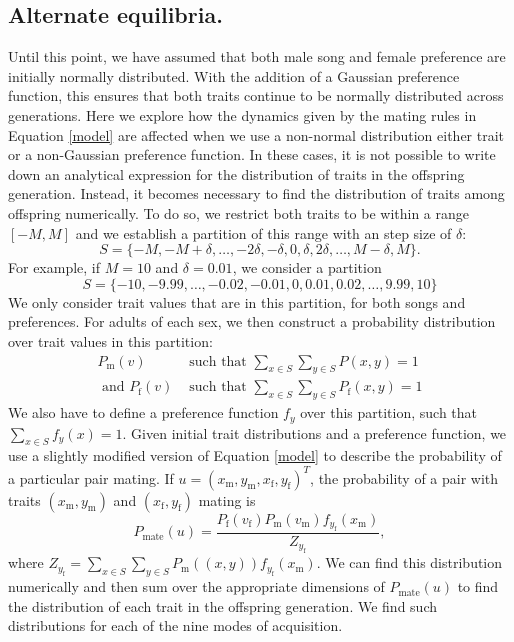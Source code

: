 \documentclass{article}
\newcommand{\x}[1]{\text{#1}}
\begin{document}
\subsection*{Alternate equilibria. }
Until this point, we have assumed that both male song and female preference are initially normally distributed. With the addition of a Gaussian preference function, this ensures that both traits continue to be normally distributed across generations. Here we explore how the dynamics given by the mating rules in Equation \ref{model} are affected when we use a non-normal distribution either trait or a non-Gaussian preference function. In these cases, it is not possible to write down an analytical expression for the distribution of traits in the offspring generation. Instead, it becomes necessary to find the distribution of traits among offspring numerically. To do so, we restrict both traits to be within a range $[-M,M]$ and we establish a partition of this range with an step size of $\delta$:
$$
S=\{-M,-M+\delta,\dots,-2\delta,-\delta,0,\delta,2\delta,\dots,M-\delta,M\}.$$
For example, if $M=10$ and $\delta=0.01$, we consider a partition $$S=\{-10,-9.99,\dots,-0.02,-0.01,0,0.01,0.02,\dots,9.99,10\}$$
We only consider trait values that are in this partition, for both songs and preferences. For adults of each sex, we then construct a probability distribution over trait values in this partition:
\begin{align*}
P_\x{m}(v) &\text{ such that } \sum_{x\in S}\sum_{y \in S}P(x,y)=1
\\ \text{ and } P_\x{f}(v) &\text{ such that } \sum_{x\in S}\sum_{y \in S}P_\x{f}(x,y)=1
\end{align*}
We also have to define a preference function $f_y$ over this partition, such that $\sum_{x\in S}f_y(x)=1$. Given initial trait distributions and a preference function, we use a slightly modified version of Equation \ref{model} to describe the probability of a particular pair mating. If $u=(x_\x{m},y_\x{m},x_\x{f},y_\x{f})^T$, the probability of a pair with traits $(x_\x{m},y_\x{m})$ and $(x_\x{f},y_\x{f})$ mating is 
\begin{equation}
P_\text{mate}(u)=\frac{P_\x{f}(v_\x{f})P_\x{m}(v_\x{m})f_{y_\x{f}}(x_\x{m})}{Z_{y_\x{f}}}, \label{model_numerical}
\end{equation}
where $Z_{y_\x{f}}=\sum_{x\in S}\sum_{y\in S}P_\x{m}((x,y))f_{y_\x{f}}(x_\x{m})$. We can find this distribution numerically and then sum over the appropriate dimensions of $P_\text{mate}(u)$ to find the distribution of each trait in the offspring generation. We find such distributions for each of the nine modes of acquisition.
\end{document}
